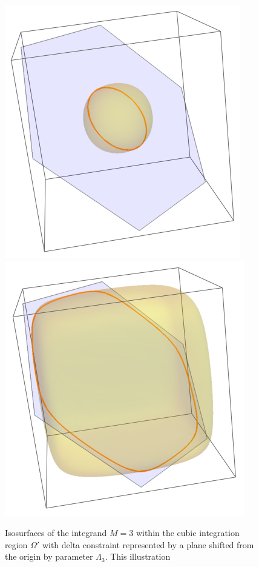 \documentclass{article}[12pt]
\numberwithin{equation}{section}
\begin{document}
\begin{figure}[H]
\centering{}
\includegraphics[scale=0.4]{figures/dos1}
\includegraphics[scale=0.4]{figures/dos2}
\caption{Isosurfaces of the integrand $M=3$ within the cubic integration
region $\Omega'$ with delta constraint represented by a plane shifted from
the origin by parameter $\Lambda_3$. This illustration }
\label{fig:dos}
\end{figure}
\end{document}
